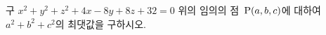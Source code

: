 구 $x^2+y^2+z^2+4x-8y+8z+32=0$ 위의 임의의 점~$\mathrm{P}(a{,}\mkern3mu\mathopen{}b{,}\mkern3mu\mathopen{}c)$에 대하여 $a^2+b^2+c^2$의 최댓값을 구하시오.
